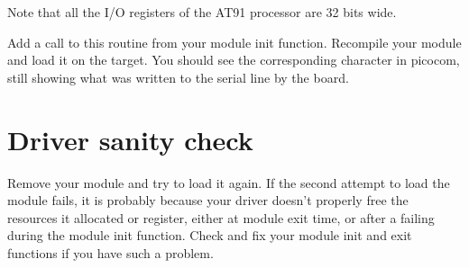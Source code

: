 Note that all the I/O registers of the AT91 processor are 32 bits
wide.

Add a call to this routine from your module init function. Recompile
your module and load it on the target. You should see the
corresponding character in picocom, still showing what was written to
the serial line by the board.

\section{Driver sanity check}

Remove your module and try to load it again. If the second attempt to
load the module fails, it is probably because your driver doesn't
properly free the resources it allocated or register, either at module
exit time, or after a failing during the module init function.  Check
and fix your module init and exit functions if you have such a
problem.
